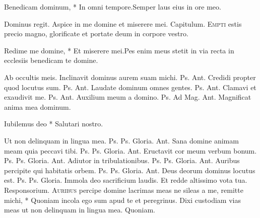 \begin{multicols*}{2}
\begin{responsory-breve}
{Benedicam dominum, * In omni tempore.}{Semper laus eius in ore meo.}
\end{responsory-breve}
\V Dominus regit.
 Aspice in me domine et miserere mei. {\color{Red} Capitulum.}
\lettrine[lines=2]{\zallmancaps \color{Red} E}{mpti} estis precio magno, glorificate et portate deum in corpore vestro.
\begin{responsory-breve}
{Redime me domine, * Et miserere mei.}{Pes enim meus stetit in via recta in ecclesiis benedicam te domine.}
\end{responsory-breve}
\V Ab occultis meis.
 Inclinavit dominus aurem suam michi. {\color{Red} Ps.}  {\color{Red} Ant.} Credidi propter quod locutus sum. {\color{Red} Ps.}  {\color{Red} Ant.} Laudate dominum omnes gentes. {\color{Red} Ps.}  {\color{Red} Ant.} Clamavi et exaudivit me. {\color{Red} Ps.}  {\color{Red} Ant.} Auxilium meum a domino. {\color{Red} Ps.}  {\color{Red} Ad Mag. Ant.} Magnificat anima mea dominum.
{\color{Red} }
\par {}
\begin{invitatory}
{Iubilemus deo * Salutari nostro.}
\end{invitatory}
 Ut non delinquam in lingua mea. {\color{Red} Ps.}  {\color{Red} Ps.}  Gloria. {\color{Red} Ant.} Sana domine animam meam quia peccavi tibi. {\color{Red} Ps.}  {\color{Red} Ps.}  Gloria. {\color{Red} Ant.} Eructavit cor meum verbum bonum. {\color{Red} Ps.}  {\color{Red} Ps.}  Gloria. {\color{Red} Ant.} Adiutor in tribulationibus. {\color{Red} Ps.}  {\color{Red} Ps.}  Gloria. {\color{Red} Ant.} Auribus percipite qui habitatis orbem. {\color{Red} Ps.}  {\color{Red} Ps.}  Gloria. {\color{Red} Ant.} Deus deorum dominus locutus est. {\color{Red} Ps.}  {\color{Red} Ps.}  Gloria. \V Immola deo sacrificium laudis. \R Et redde altissimo vota tua. {\color{Red} Responsorium.}
\lettrine[lines=2]{\zallmancaps \color{Red} A}{uribus} \hypertarget{auribus-percipe}{\label{auribus-percipe}} percipe domine lacrimas meas ne sileas a me, remitte michi, * Quoniam incola ego sum apud te et peregrinus. \V Dixi custodiam vias meas ut non delinquam in lingua mea. Quoniam.

\end{multicols*}
